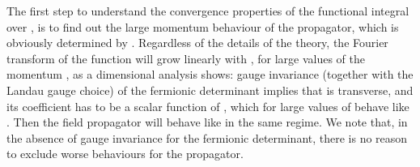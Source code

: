 \documentclass[a4paper,12pt]{article}
\begin{document}
The first step to understand the convergence properties of the
functional integral over \coordHE{}, is to find out the large momentum
behaviour of the propagator, which is obviously determined by
\coordHE{}. Regardless of the details of the theory, the
Fourier transform of the function \coordHE{} will grow
linearly with \coordHE{}, for large values of the momentum \coordHE{}, as a
dimensional analysis shows: gauge invariance (together with the Landau
gauge choice) of the fermionic determinant implies that \coordHE{} is transverse, and its coefficient has to be a scalar
function of \coordHE{}, which for large values of \coordHE{} behave like \coordHE{}.  Then the \coordHE{} field propagator will behave like \coordHE{}
in the same regime.  We note that, in the absence of gauge invariance
for the fermionic determinant, there is no reason to exclude worse
behaviours for the propagator.
\end{document}
